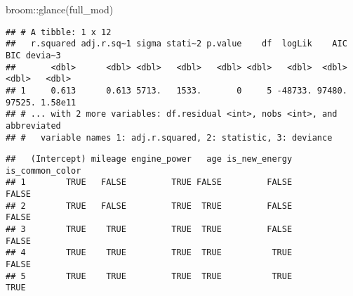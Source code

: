 \documentclass[
]{article}
\newenvironment{Shaded}{\begin{snugshade}}{\end{snugshade}}
\newcommand{\AttributeTok}[1]{\textcolor[rgb]{0.77,0.63,0.00}{#1}}
\newcommand{\DecValTok}[1]{\textcolor[rgb]{0.00,0.00,0.81}{#1}}
\newcommand{\FunctionTok}[1]{\textcolor[rgb]{0.00,0.00,0.00}{#1}}
\newcommand{\NormalTok}[1]{#1}
\newcommand{\OtherTok}[1]{\textcolor[rgb]{0.56,0.35,0.01}{#1}}
\newcommand{\SpecialCharTok}[1]{\textcolor[rgb]{0.00,0.00,0.00}{#1}}
\newcommand{\StringTok}[1]{\textcolor[rgb]{0.31,0.60,0.02}{#1}}
\begin{document}
\begin{Shaded}
\begin{Highlighting}[]
\NormalTok{broom}\SpecialCharTok{::}\FunctionTok{glance}\NormalTok{(full\_mod)}
\end{Highlighting}
\end{Shaded}

\begin{verbatim}
## # A tibble: 1 x 12
##   r.squared adj.r.sq~1 sigma stati~2 p.value    df  logLik    AIC    BIC devia~3
##       <dbl>      <dbl> <dbl>   <dbl>   <dbl> <dbl>   <dbl>  <dbl>  <dbl>   <dbl>
## 1     0.613      0.613 5713.   1533.       0     5 -48733. 97480. 97525. 1.58e11
## # ... with 2 more variables: df.residual <int>, nobs <int>, and abbreviated
## #   variable names 1: adj.r.squared, 2: statistic, 3: deviance
\end{verbatim}

\begin{Shaded}
\end{Shaded}

\begin{verbatim}
##   (Intercept) mileage engine_power   age is_new_energy is_common_color
## 1        TRUE   FALSE         TRUE FALSE         FALSE           FALSE
## 2        TRUE   FALSE         TRUE  TRUE         FALSE           FALSE
## 3        TRUE    TRUE         TRUE  TRUE         FALSE           FALSE
## 4        TRUE    TRUE         TRUE  TRUE          TRUE           FALSE
## 5        TRUE    TRUE         TRUE  TRUE          TRUE            TRUE
\end{verbatim}

\begin{Shaded}
\end{Shaded}
\end{document}
